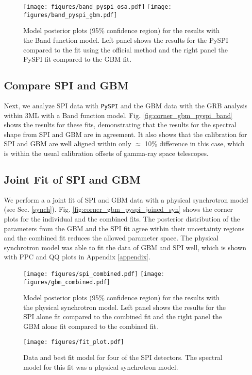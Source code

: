 \documentclass[twocolumn,traditabstract]{aa}
\begin{document}
\begin{figure*}
  \begin{centering}
    \texttt{[image: figures/band\_pyspi\_osa.pdf]}
    \texttt{[image: figures/band\_pyspi\_gbm.pdf]}   \caption{Model posterior plots (95\% confidence region) for the results with the Band function model. Left panel shows the results for the PySPI compared to the fit using the official method and the right panel the PySPI fit compared to the GBM fit.}
    \label{fig:model_plot_band}
  \end{centering}
\end{figure*}

\subsection{Compare SPI and GBM}
\label{pyspi_gbm}
Next, we analyze SPI data with {\tt PySPI} and the GBM data with the GRB analysis within 3ML with a Band function model. Fig. \ref{fig:corner_gbm_pyspi_band} shows the results for these fits, demonstrating that the results for the spectral shape from SPI and GBM are in agreement. It also shows that the calibration for SPI and GBM are well aligned within only $\approx$ 10\% difference in this case, which is within the usual calibration offsets of gamma-ray space telescopes.

\subsection{Joint Fit of SPI and GBM}
\label{pyspi_gbm_joined}
We perform a a joint fit of SPI and GBM data with a physical synchrotron model (see Sec. \ref{synch}). Fig. \ref{fig:corner_gbm_pyspi_joined_syn} shows the corner plots for the individual and the combined fits. The posterior distribution of the parameters from the GBM and the SPI fit agree within their uncertainty regions and the combined fit reduces the allowed parameter space. The physical synchrotron model was able to fit the data of GBM and SPI well, which is shown with PPC and QQ plots in Appendix \ref{appendix}.



\begin{figure*}
  \begin{centering}
    \texttt{[image: figures/spi\_combined.pdf]}
    \texttt{[image: figures/gbm\_combined.pdf]}   \caption{Model posterior plots (95\% confidence region) for the results with the physical synchrotron model. Left panel shows the results for the SPI alone fit compared to the combined fit and the right panel the GBM alone fit compared to the combined fit.}
    \label{fig:model_plot_syn}
  \end{centering}
\end{figure*}
\begin{figure*}
  \begin{centering}
    \texttt{[image: figures/fit\_plot.pdf]}
    \caption{Data and best fit model for four of the SPI detectors. The spectral model for this fit was a physical synchrotron model.}
    \label{fig:Data }
  \end{centering}
\end{figure*}
\clearpage
\end{document}
